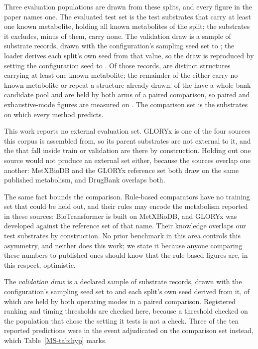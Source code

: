 \documentclass[journal=jcisd8,manuscript=suppinfo,layout=onecolumn]{achemso}
\begin{document}
Three evaluation populations are drawn from these splits, and every figure in the paper names
one. The evaluated test set is the \numPopulationTestsubs{} test substrates that carry at least
one known metabolite, holding all \numPopulationTestrefs{} known metabolites of the split; the substrates it
excludes, \numSplitTestSubstrates{} minus \numPopulationTestsubs{} of them, carry none. The
validation draw is a sample of \numValdrawCap{} substrate records, drawn with the configuration's
sampling seed set to \numValdrawSeed{}; the loader derives each split's own seed from that value,
so the draw is reproduced by setting the configuration seed
to \numValdrawSeed{}. Of those records, \numValdrawDeclared{} are distinct structures
carrying at least one known metabolite; the remainder of the \numValdrawCap{} either carry no known metabolite or
repeat a structure already drawn. \numValdrawPaired{} of the \numValdrawDeclared{} have a
whole-bank candidate pool and are held by both arms of a paired comparison, so paired and
exhaustive-mode figures are measured on \numValdrawPaired{}. The comparison set is the
\numPopulationN{} substrates on which
every method predicts.

This work reports no external evaluation set. GLORYx is one of the four sources this corpus is
assembled from, so its \numGloryxN{} parent substrates are not external to it, and the
\numGloryxOverlap{} that fall inside train or validation are there by construction.
Holding out one source would not produce an external set either, because the sources
overlap one another: MetXBioDB and the GLORYx reference set both draw on the same published
metabolism, and DrugBank overlaps both.

The same fact bounds the comparison. Rule-based comparators have no training set that could be
held out, and their rules may encode the metabolism reported in these sources: BioTransformer is
built on MetXBioDB, and GLORYx was developed against the reference set of that name. Their
knowledge overlaps our test substrates by construction. No prior benchmark in this area controls
this asymmetry, and neither does this work; we state it because anyone comparing these numbers to
published ones should know that the rule-based figures are, in this respect, optimistic.


The \emph{validation draw} is a declared sample of \numValdrawCap{} substrate records, drawn with
the configuration's sampling seed set to \numValdrawSeed{} and each split's own seed derived from
it, of which \numValdrawPaired{} are held by both operating modes in a paired
comparison. Registered ranking and timing thresholds are checked here, because a threshold checked
on the population that chose the setting it tests is not a check. Three of the ten reported
predictions were in the event adjudicated on the comparison set instead, which
Table~\ref{MS-tab:hyp} marks.
\end{document}
